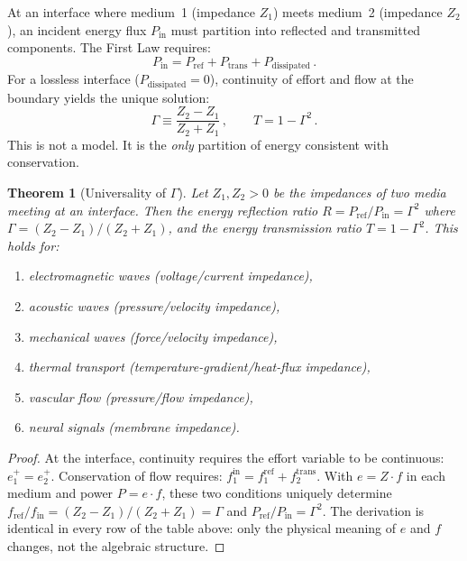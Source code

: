 \documentclass[aps,pre,twocolumn,superscriptaddress,floatfix]{revtex4-2}
\newtheorem{theorem}{Theorem}
\begin{document}
At an interface where medium~1 (impedance $Z_1$) meets
medium~2 (impedance $Z_2$), an incident energy flux
$P_{\text{in}}$ must partition into reflected and
transmitted components.  The First Law requires:
\begin{equation}
  P_{\text{in}} = P_{\text{ref}} + P_{\text{trans}}
  + P_{\text{dissipated}}\,.
  \label{eq:first-law}
\end{equation}
For a lossless interface ($P_{\text{dissipated}}=0$),
continuity of effort and flow at the boundary yields
the unique solution:
\begin{equation}
  \Gamma \equiv \frac{Z_2 - Z_1}{Z_2 + Z_1}\,,
  \qquad
  T = 1 - \Gamma^2\,.
  \label{eq:gamma-T}
\end{equation}
This is not a model.  It is the \emph{only} partition of
energy consistent with conservation.

\begin{theorem}[Universality of $\Gamma$]
\label{thm:universality}
Let $Z_1, Z_2 > 0$ be the impedances of two media meeting
at an interface.  Then the energy reflection ratio
$R = P_{\mathrm{ref}}/P_{\mathrm{in}} = \Gamma^2$ where
$\Gamma=(Z_2-Z_1)/(Z_2+Z_1)$, and the energy transmission
ratio $T = 1 - \Gamma^2$.  This holds for:
\begin{enumerate}
  \item electromagnetic waves (voltage/current impedance),
  \item acoustic waves (pressure/velocity impedance),
  \item mechanical waves (force/velocity impedance),
  \item thermal transport (temperature-gradient/heat-flux impedance),
  \item vascular flow (pressure/flow impedance),
  \item neural signals (membrane impedance).
\end{enumerate}
\end{theorem}

\begin{proof}
At the interface, continuity requires the effort variable to
be continuous: $e_1^+ = e_2^+$.
Conservation of flow requires:
$f_1^{\text{in}} = f_1^{\text{ref}} + f_2^{\text{trans}}$.
With $e = Z \cdot f$ in each medium and power $P = e \cdot f$,
these two conditions uniquely determine
$f_{\text{ref}}/f_{\text{in}} = (Z_2-Z_1)/(Z_2+Z_1) = \Gamma$
and $P_{\text{ref}}/P_{\text{in}} = \Gamma^2$.
The derivation is identical in every row of the table above:
only the physical meaning of $e$ and $f$ changes, not the
algebraic structure.
\end{proof}
\end{document}
